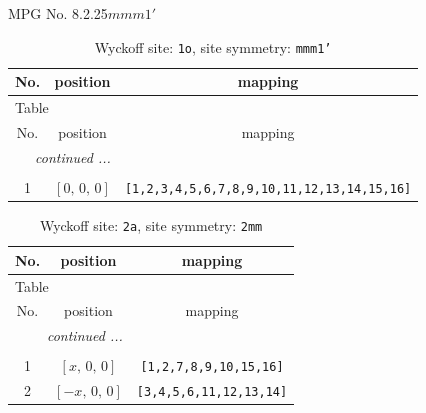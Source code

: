 \documentclass[fleqn,8pt]{jsarticle}
\begin{document}
\setcounter{MaxMatrixCols}{32}

\renewcommand{\tablename}{Table~}
\renewcommand{\figurename}{Figure~}
\begin{center}
\LARGE
MPG No. 8.2.25\quad$mmm1'$
\end{center}
\renewcommand{\arraystretch}{1.2}
\begin{longtable}{ccc}
\caption{Wyckoff site: {\tt 1o}, site symmetry: {\tt mmm1'}}
 \\
 \hline \hline
No. & position & mapping \\ \hline \endfirsthead

\multicolumn{2}{l}{\tablename\ \thetable{}} \\
 \hline \hline
No. & position & mapping \\ \hline \endhead

 \hline \hline
\multicolumn{2}{r}{\footnotesize\it continued ...} \\ \endfoot

 \hline \hline
\multicolumn{2}{r}{} \\ \endlastfoot

1 & $\left[ 0,\, 0,\, 0 \right]$ & {\tt [1,2,3,4,5,6,7,8,9,10,11,12,13,14,15,16]} \\
\end{longtable}
\renewcommand{\arraystretch}{1.2}
\begin{longtable}{ccc}
\caption{Wyckoff site: {\tt 2a}, site symmetry: {\tt 2mm}}
 \\
 \hline \hline
No. & position & mapping \\ \hline \endfirsthead

\multicolumn{2}{l}{\tablename\ \thetable{}} \\
 \hline \hline
No. & position & mapping \\ \hline \endhead

 \hline \hline
\multicolumn{2}{r}{\footnotesize\it continued ...} \\ \endfoot

 \hline \hline
\multicolumn{2}{r}{} \\ \endlastfoot

1 & $\left[ x,\, 0,\, 0 \right]$ & {\tt [1,2,7,8,9,10,15,16]} \\ \hline
2 & $\left[ - x,\, 0,\, 0 \right]$ & {\tt [3,4,5,6,11,12,13,14]} \\
\end{longtable}
\renewcommand{\arraystretch}{1.2}
\end{document}
